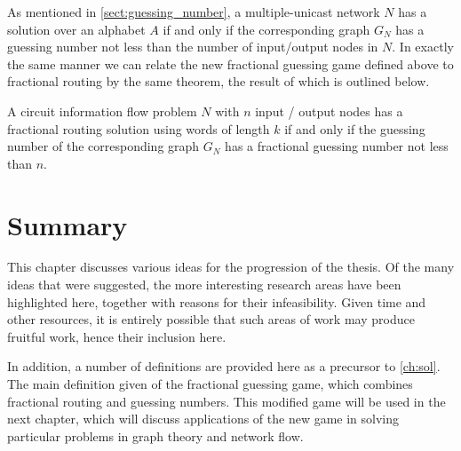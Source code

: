 As mentioned in \autoref{sect:guessing_number}, a multiple-unicast network $N$ has a solution over an alphabet $A$ if and only if the corresponding graph $G_N$ has a guessing number not less than the number of input/output nodes in $N$. In exactly the same manner we can relate the new fractional guessing game defined above to fractional routing by the same theorem, the result of which is outlined below.

\begin{theorem}
A circuit information flow problem $N$ with $n$ input / output nodes has a fractional routing solution using words of length $k$ if and only if the guessing number of the corresponding graph $G_N$ has a fractional guessing number not less than $n$.
\end{theorem}

\section{Summary}

This chapter discusses various ideas for the progression of the thesis. Of the many ideas that were suggested, the more interesting research areas have been highlighted here, together with reasons for their infeasibility. Given time and other resources, it is entirely possible that such areas of work may produce fruitful work, hence their inclusion here.

In addition, a number of definitions are provided here as a precursor to \autoref{ch:sol}. The main definition given of the fractional guessing game, which combines fractional routing and guessing numbers. This modified game will be used in the next chapter, which will discuss applications of the new game in solving particular problems in graph theory and network flow.